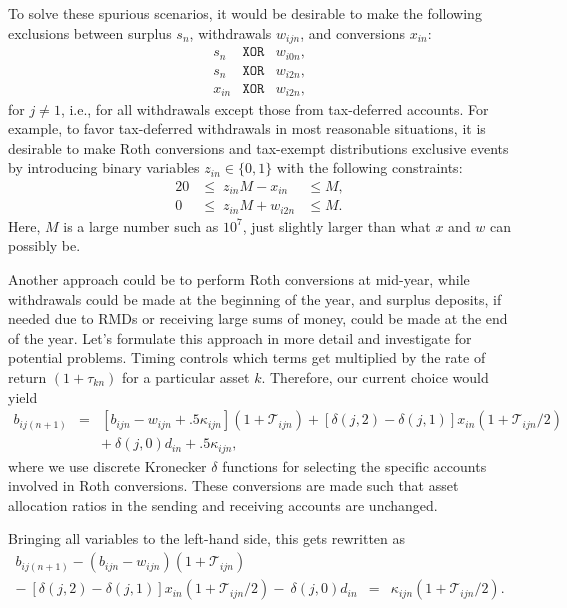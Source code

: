 \documentclass{report}[fleqn,12pt]
\begin{document}
	To solve these spurious scenarios, it would be desirable to make the following exclusions
	between surplus $s_n$, withdrawals $w_{ijn}$, and conversions $x_{in}$:
	\begin{eqnarray*}
		s_n &\texttt{XOR} & w_{i0n}, \\
		s_n &\texttt{XOR} & w_{i2n}, \\
		x_{in} &\texttt{XOR} & w_{i2n},
	\end{eqnarray*}
	for $j \neq 1$, i.e., for all withdrawals except those from tax-deferred accounts.
	For example, to favor tax-deferred withdrawals in most reasonable situations,
	it is desirable to make Roth conversions and tax-exempt distributions exclusive events
	by introducing binary variables $z_{in} \in \{0, 1\}$ with the following constraints:
	\begin{alignat}{2}
		\label{Eq:Binary}
		0 & \le \; z_{in}M - x_{in} &\le M, \nonumber \\
		0 & \le \; z_{in}M + w_{i2n} &\le M.
	\end{alignat}
	Here, $M$ is a large number such as $10^7$, just slightly
	larger than what $x$ and $w$ can possibly be.

	Another approach could be to perform Roth conversions at mid-year, while withdrawals
	could be made at the beginning of the year, and surplus deposits,
	if needed due to RMDs or receiving large sums of money,
	could be made at the end of the year. Let's formulate this approach
	in more detail and investigate for potential problems.
	Timing controls which terms get multiplied by the rate of return $(1 + \tau_{kn})$
	for a particular asset $k$.
	Therefore, our current choice would yield
	\begin{eqnarray}
		\label{Eq:C3a}
		b_{ij(n+1)} &=& [b_{ijn} - w_{ijn} + .5\kappa_{ijn}](1 + \mathcal{T}_{ijn})
		+ [\delta(j, 2) - \delta(j, 1)]x_{in} (1 + \mathcal{T}_{ijn}/2)
		\nonumber \\
		&& 
		+\ \delta(j, 0) d_{in} + .5 \kappa_{ijn},
	\end{eqnarray}
	where we use discrete Kronecker $\delta$ functions for selecting the specific accounts involved
	in Roth conversions. These conversions are made such that asset allocation
	ratios in the sending and receiving accounts are unchanged.

	Bringing all variables
	to the left-hand side, this gets rewritten as
	\begin{eqnarray}
		\label{Eq:C3}
		b_{ij(n+1)} - (b_{ijn} - w_{ijn}) (1 + \mathcal{T}_{ijn})
		&& \nonumber \\
		-\ [\delta(j, 2) - \delta(j, 1)]x_{in}(1 + \mathcal{T}_{ijn}/2)
		-\ \delta(j, 0) d_{in}
		&=& \kappa_{ijn} (1 + \mathcal{T}_{ijn}/2).
	\end{eqnarray}
\end{document}
